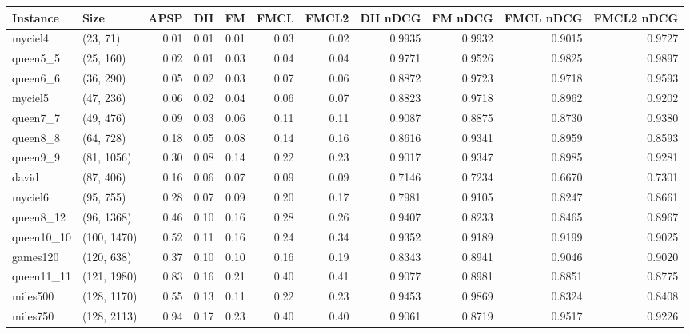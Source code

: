 \begin{tabular}{llrrrrrrrrr}
\toprule
  Instance &         Size &  APSP &   DH &   FM &  FMCL &  FMCL2 &  DH nDCG &  FM nDCG &  FMCL nDCG &  FMCL2 nDCG \\
\midrule
   myciel4 &     (23, 71) &  0.01 & 0.01 & 0.01 &  0.03 &   0.02 &   0.9935 &   0.9932 &     0.9015 &      0.9727 \\
  queen5\_5 &    (25, 160) &  0.02 & 0.01 & 0.03 &  0.04 &   0.04 &   0.9771 &   0.9526 &     0.9825 &      0.9897 \\
  queen6\_6 &    (36, 290) &  0.05 & 0.02 & 0.03 &  0.07 &   0.06 &   0.8872 &   0.9723 &     0.9718 &      0.9593 \\
   myciel5 &    (47, 236) &  0.06 & 0.02 & 0.04 &  0.06 &   0.07 &   0.8823 &   0.9718 &     0.8962 &      0.9202 \\
  queen7\_7 &    (49, 476) &  0.09 & 0.03 & 0.06 &  0.11 &   0.11 &   0.9087 &   0.8875 &     0.8730 &      0.9380 \\
  queen8\_8 &    (64, 728) &  0.18 & 0.05 & 0.08 &  0.14 &   0.16 &   0.8616 &   0.9341 &     0.8959 &      0.8593 \\
  queen9\_9 &   (81, 1056) &  0.30 & 0.08 & 0.14 &  0.22 &   0.23 &   0.9017 &   0.9347 &     0.8985 &      0.9281 \\
     david &    (87, 406) &  0.16 & 0.06 & 0.07 &  0.09 &   0.09 &   0.7146 &   0.7234 &     0.6670 &      0.7301 \\
   myciel6 &    (95, 755) &  0.28 & 0.07 & 0.09 &  0.20 &   0.17 &   0.7981 &   0.9105 &     0.8247 &      0.8661 \\
 queen8\_12 &   (96, 1368) &  0.46 & 0.10 & 0.16 &  0.28 &   0.26 &   0.9407 &   0.8233 &     0.8465 &      0.8967 \\
queen10\_10 &  (100, 1470) &  0.52 & 0.11 & 0.16 &  0.24 &   0.34 &   0.9352 &   0.9189 &     0.9199 &      0.9025 \\
  games120 &   (120, 638) &  0.37 & 0.10 & 0.10 &  0.16 &   0.19 &   0.8343 &   0.8941 &     0.9046 &      0.9020 \\
queen11\_11 &  (121, 1980) &  0.83 & 0.16 & 0.21 &  0.40 &   0.41 &   0.9077 &   0.8981 &     0.8851 &      0.8775 \\
  miles500 &  (128, 1170) &  0.55 & 0.13 & 0.11 &  0.22 &   0.23 &   0.9453 &   0.9869 &     0.8324 &      0.8408 \\
  miles750 &  (128, 2113) &  0.94 & 0.17 & 0.23 &  0.40 &   0.40 &   0.9061 &   0.8719 &     0.9517 &      0.9226 \\

\end{tabular}
